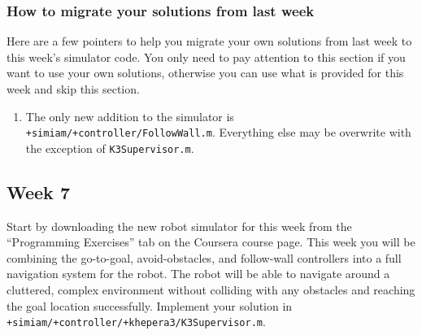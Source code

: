 \documentclass[10pt]{article}
\begin{document}
\subsubsection*{How to migrate your solutions from last week}
Here are a few pointers to help you migrate your own solutions from last week to this week's simulator code. You only need to pay attention to this section if you want to use your own solutions, otherwise you can use what is provided for this week and skip this section.

\begin{enumerate}
 \item The only new addition to the simulator is \texttt{+simiam/+controller/FollowWall.m}. Everything else may be overwrite with the exception of \texttt{K3Supervisor.m}.
\end{enumerate}

\subsection{Week 7}
Start by downloading the new robot simulator for this week from the ``Programming Exercises'' tab on the Coursera course page. This week you will be combining the go-to-goal, avoid-obstacles, and follow-wall controllers into a full navigation system for the robot. The robot will be able to navigate around a cluttered, complex environment without colliding with any obstacles and reaching the goal location successfully. Implement your solution in \texttt{+simiam/+controller/+khepera3/K3Supervisor.m}.
\end{document}
